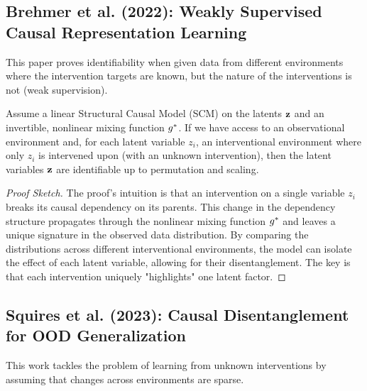 \documentclass{article}
\begin{document}
\subsection{Brehmer et al. (2022): Weakly Supervised Causal Representation Learning}
This paper proves identifiability when given data from different environments where the intervention targets are known, but the nature of the interventions is not (weak supervision).

\begin{theorem}
Assume a linear Structural Causal Model (SCM) on the latents ${\mathbf{z}}$ and an invertible, nonlinear mixing function $g^*$. If we have access to an observational environment and, for each latent variable $z_i$, an interventional environment where only $z_i$ is intervened upon (with an unknown intervention), then the latent variables ${\mathbf{z}}$ are identifiable up to permutation and scaling.
\end{theorem}
\begin{proof}[Proof Sketch]
The proof's intuition is that an intervention on a single variable $z_i$ breaks its causal dependency on its parents. This change in the dependency structure propagates through the nonlinear mixing function $g^*$ and leaves a unique signature in the observed data distribution. By comparing the distributions across different interventional environments, the model can isolate the effect of each latent variable, allowing for their disentanglement. The key is that each intervention uniquely "highlights" one latent factor.
\end{proof}

\subsection{Squires et al. (2023): Causal Disentanglement for OOD Generalization}
This work tackles the problem of learning from unknown interventions by assuming that changes across environments are sparse.
\end{document}
